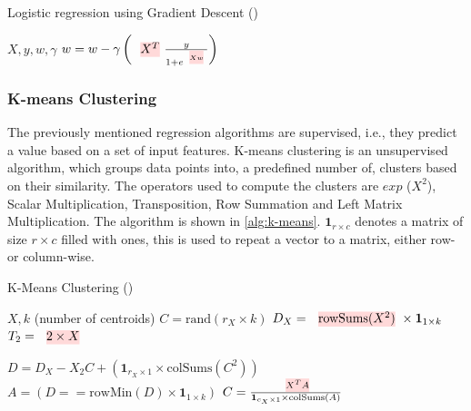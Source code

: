 \begin{algorithm}[ht]
    \caption[Linear regression]{Logistic regression using Gradient Descent
        (\cite{morpheus})}\label{alg:logistic-regression}
    \begin{algorithmic}
        \Require $X, y , w, \gamma$
        \State $w = w - \gamma \left(\text{\red{$X^T$}} \frac{y}{1+e^{\text{\red{$X w$}}}}\right)$
        \EndFor
    \end{algorithmic}
\end{algorithm}

\subsubsection{K-means Clustering}
The previously mentioned regression algorithms are supervised, i.e., they predict a value based on a set of input features. K-means clustering is an unsupervised algorithm, which groups data points into, a predefined number of, clusters based on their similarity. The operators used to compute the clusters are $exp$ ($X^2$), Scalar Multiplication, Transposition, Row Summation and Left Matrix Multiplication. The algorithm is shown in \autoref{alg:k-means}. $\mathbf{1}_{r \times c}$ denotes a matrix of size $r \times c$ filled with ones, this is used to repeat a vector to a matrix, either row- or column-wise.

\begin{algorithm}[ht]
    \caption[K-Means Clustering]{K-Means Clustering
        (\cite{morpheus})}\label{alg:k-means}
    \begin{algorithmic}
        \Require $X, k$ (number of centroids)
        \State $C = \text{rand}(r_X \times k)$ 
        \State $D_X = \text{\red{rowSums($X^2$)}} \times \mathbf{1}_{1 \times k}$ 
        \State $T_2 = \text{\red{$2 \times X$}}$

        \State $D = D_X - X_2C + \left( \mathbf{1}_{r_X\times 1} \times \text{colSums}(C^2) \right)$ 
        \State $A = (D == \text{rowMin}(D) \times \mathbf{1}_{1 \times k})$ 
        \State $C =\frac{\text{\red{$X^T A$}}}{\mathbf{1}_{c_X \times 1} \times \text{colSums}(A)}$ 
        \EndFor
    \end{algorithmic}
\end{algorithm}

